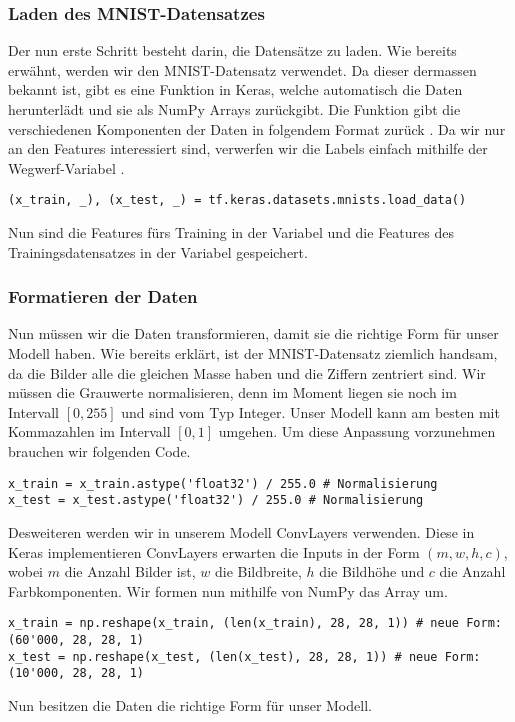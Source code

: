 \subsubsection{Laden des MNIST-Datensatzes}
Der nun erste Schritt besteht darin, die Datensätze zu laden. Wie bereits
erwähnt, werden wir den MNIST-Datensatz verwendet. Da dieser dermassen bekannt
ist, gibt es eine Funktion in Keras, welche automatisch die Daten herunterlädt
und sie als NumPy Arrays zurückgibt. Die Funktion gibt die verschiedenen
Komponenten der Daten in folgendem Format zurück . Da wir nur an den Features  interessiert sind,
verwerfen wir die Labels  einfach mithilfe der Wegwerf-Variabel \code{\_}.
\begin{verbatim}
(x_train, _), (x_test, _) = tf.keras.datasets.mnists.load_data()
\end{verbatim}
Nun sind die Features fürs Training in der Variabel  und die
Features des Trainingsdatensatzes in der Variabel  gespeichert.

\subsubsection{Formatieren der Daten}
Nun müssen wir die Daten transformieren, damit sie die richtige Form für
unser Modell haben. Wie bereits erklärt, ist der MNIST-Datensatz ziemlich
handsam, da die Bilder alle die gleichen Masse haben und die Ziffern zentriert sind.
\para{}
Wir müssen die Grauwerte normalisieren, denn im Moment liegen sie noch
im Intervall $[0, 255]$ und sind vom Typ Integer. Unser Modell kann am besten
mit Kommazahlen im Intervall $[0,1]$ umgehen. Um diese Anpassung vorzunehmen
brauchen wir folgenden Code.
\begin{verbatim}
x_train = x_train.astype('float32') / 255.0 # Normalisierung
x_test = x_test.astype('float32') / 255.0 # Normalisierung
\end{verbatim}
Desweiteren werden wir in unserem Modell ConvLayers verwenden. Diese in Keras
implementieren ConvLayers erwarten die Inputs in der Form $(m, w, h, c)$, wobei
$m$ die Anzahl Bilder ist, $w$ die Bildbreite, $h$ die Bildhöhe und $c$ die
Anzahl Farbkomponenten. Wir formen nun mithilfe von NumPy das Array um.
\begin{verbatim}
x_train = np.reshape(x_train, (len(x_train), 28, 28, 1)) # neue Form: (60'000, 28, 28, 1)
x_test = np.reshape(x_test, (len(x_test), 28, 28, 1)) # neue Form: (10'000, 28, 28, 1)
\end{verbatim}
Nun besitzen die Daten die richtige Form für unser Modell.

